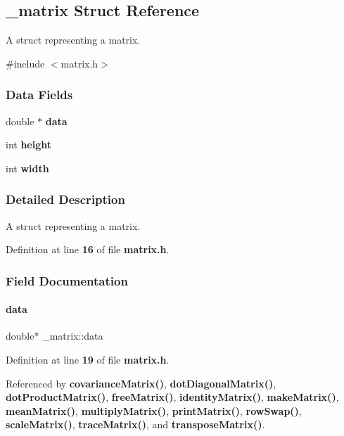 \subsection{\+\_\+matrix Struct Reference}
\label{a00183}


A struct representing a matrix.  




{\ttfamily \#include $<$matrix.\+h$>$}

\subsubsection*{Data Fields}
\begin{DoxyCompactItemize}
\item 
double $\ast$ \textbf{ data}
\item 
int \textbf{ height}
\item 
int \textbf{ width}
\end{DoxyCompactItemize}


\subsubsection{Detailed Description}
A struct representing a matrix. 

Definition at line \textbf{ 16} of file \textbf{ matrix.\+h}.



\subsubsection{Field Documentation}
\mbox{\label{a00183_ad3fdadaa9e22623d5830e37663d500be}} 
\paragraph{data}
{\footnotesize\ttfamily double$\ast$ \+\_\+matrix\+::data}



Definition at line \textbf{ 19} of file \textbf{ matrix.\+h}.



Referenced by \textbf{ covariance\+Matrix()}, \textbf{ dot\+Diagonal\+Matrix()}, \textbf{ dot\+Product\+Matrix()}, \textbf{ free\+Matrix()}, \textbf{ identity\+Matrix()}, \textbf{ make\+Matrix()}, \textbf{ mean\+Matrix()}, \textbf{ multiply\+Matrix()}, \textbf{ print\+Matrix()}, \textbf{ row\+Swap()}, \textbf{ scale\+Matrix()}, \textbf{ trace\+Matrix()}, and \textbf{ transpose\+Matrix()}.

